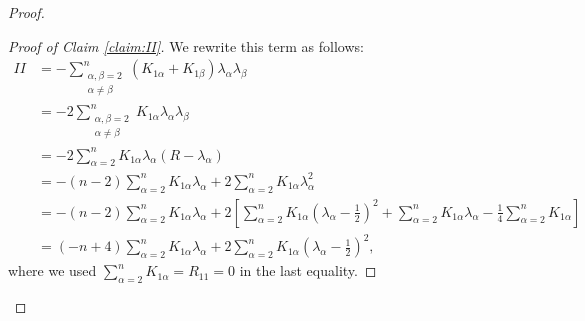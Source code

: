 \documentclass[a4, 12pt]{amsart}
\theoremstyle{plain}
\begin{document}
\begin{proof}
	\begin{proof}[Proof of Claim \ref{claim:II}]
		We rewrite this term as follows:
		\begin{align*}
			II &= -\sum_{\substack{\alpha,\beta=2 \\ \alpha\neq\beta}}^n (K_{1\alpha} + K_{1\beta})\lambda_\alpha\lambda_\beta \\
			&= -2\sum_{\substack{\alpha,\beta=2 \\ \alpha\neq\beta}}^n K_{1\alpha}\lambda_\alpha\lambda_\beta \\
			&= -2\sum_{\alpha=2}^n K_{1\alpha}\lambda_\alpha(R - \lambda_\alpha) \\
			&= -(n-2)\sum_{\alpha=2}^n K_{1\alpha}\lambda_\alpha + 2\sum_{\alpha=2}^n K_{1\alpha}\lambda_\alpha^2 \\
			&= -(n-2)\sum_{\alpha=2}^n K_{1\alpha}\lambda_\alpha + 2\left[\sum_{\alpha=2}^n K_{1\alpha}\left(\lambda_\alpha - \frac{1}{2}\right)^2 + \sum_{\alpha=2}^n K_{1\alpha}\lambda_\alpha - \frac{1}{4}\sum_{\alpha=2}^n K_{1\alpha}\right] \\
			&= (-n+4)\sum_{\alpha=2}^n K_{1\alpha}\lambda_\alpha + 2\sum_{\alpha=2}^n K_{1\alpha}\left(\lambda_\alpha - \frac{1}{2}\right)^2,
		\end{align*}
		where we used $\sum_{\alpha=2}^n K_{1\alpha} = R_{11} = 0$ in the last equality.
		

\end{proof}
\end{proof}
\end{document}
